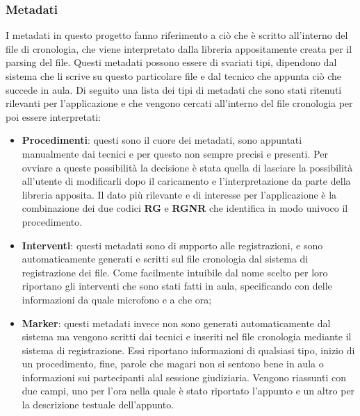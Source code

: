 \subsubsection{Metadati}
I metadati in questo progetto fanno riferimento a ciò che è scritto all'interno del file di cronologia, che viene interpretato dalla libreria appositamente creata per il parsing del file.
Questi metadati possono essere di svariati tipi, dipendono dal sistema che li scrive su questo particolare file e dal tecnico che appunta ciò che succede in aula. Di seguito una lista
dei tipi di metadati che sono stati ritenuti rilevanti per l'applicazione e che vengono cercati all'interno del file cronologia per poi essere interpretati:
\begin{itemize}
  \item \textbf{Procedimenti}: questi sono il cuore dei metadati, sono appuntati manualmente dai tecnici e per questo non sempre precisi e presenti. Per ovviare a queste possibilità
        la decisione è stata quella di lasciare la possibilità all'utente di modificarli dopo il caricamento e l'interpretazione da parte della libreria apposita. Il dato più rilevante e
        di interesse per l'applicazione è la combinazione dei due codici \textbf{RG} e \textbf{RGNR} che identifica in modo univoco il procedimento.
  \item \textbf{Interventi}: questi metadati sono di supporto alle registrazioni, e sono automaticamente generati e scritti sul file cronologia dal sistema di registrazione dei file. Come
        facilmente intuibile dal nome scelto per loro riportano gli interventi che sono stati fatti in aula, specificando con delle informazioni da quale microfono e a che ora;
  \item \textbf{Marker}: questi metadati invece non sono generati automaticamente dal sistema ma vengono scritti dai tecnici e inseriti nel file cronologia mediante il sistema di registrazione.
        Essi riportano informazioni di qualsiasi tipo, inizio di un procedimento, fine, parole che magari non si sentono bene in aula o informazioni sui partecipanti alal sessione giudiziaria.
        Vengono riassunti con due campi, uno per l'ora nella quale è stato riportato l'appunto e un altro per la descrizione testuale dell'appunto.
\end{itemize}


